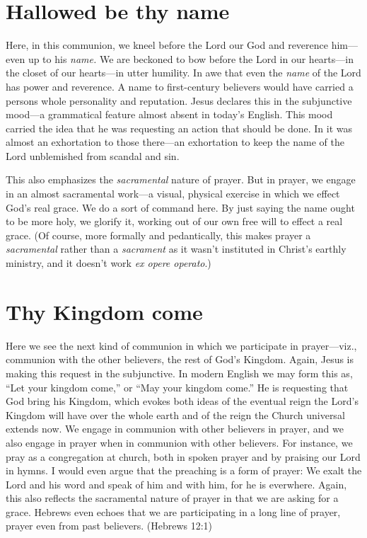 \documentclass[12pt]{article}
\begin{document}
\section{Hallowed be thy name}

Here, in this communion, we kneel before the Lord our God and reverence him---even up to his \emph{name.}  We are beckoned to bow before the Lord in our hearts---in the closet of our hearts---in utter humility.  In awe that even the \emph{name} of the Lord has power and reverence.  A name to first-century believers would have carried a persons whole personality and reputation.  Jesus declares this in the subjunctive mood---a grammatical feature almost absent in today's English.  This mood carried the idea that he was requesting an action that should be done.  In it was almost an exhortation to those there---an exhortation to keep the name of the Lord unblemished from scandal and sin.

This also emphasizes the \emph{sacramental} nature of prayer.  But in prayer, we engage in an almost sacramental work---a visual, physical exercise in which we effect God's real grace.  We do a sort of command here.  By just saying the name ought to be more holy, we glorify it, working out of our own free will to effect a real grace.  (Of course, more formally and pedantically, this makes prayer a \emph{sacramental} rather than a \emph{sacrament} as it wasn't instituted in Christ's earthly ministry, and it doesn't work \emph{ex opere operato}.)



\section{Thy Kingdom come}
\label{sec-5}
Here we see the next kind of communion in which we participate in prayer---viz., communion with the other believers, the rest of God's Kingdom.  Again, Jesus is making this request in the subjunctive.  In modern English we may form this as, ``Let your kingdom come,'' or ``May your kingdom come.''  He is requesting that God bring his Kingdom, which evokes both ideas of the eventual reign the Lord's Kingdom will have over the whole earth and of the reign the Church universal extends now.  We engage in communion with other believers in prayer, and we also engage in prayer when in communion with other believers.  For instance, we pray as a congregation at church, both in spoken prayer and by praising our Lord in hymns.  I would even argue that the preaching is a form of prayer: We exalt the Lord and his word and speak of him and with him, for he is everwhere.  Again, this also reflects the sacramental nature of prayer in that we are asking for a grace.  Hebrews even echoes that we are participating in a long line of prayer, prayer even from past believers.  (Hebrews 12:1)
\end{document}
